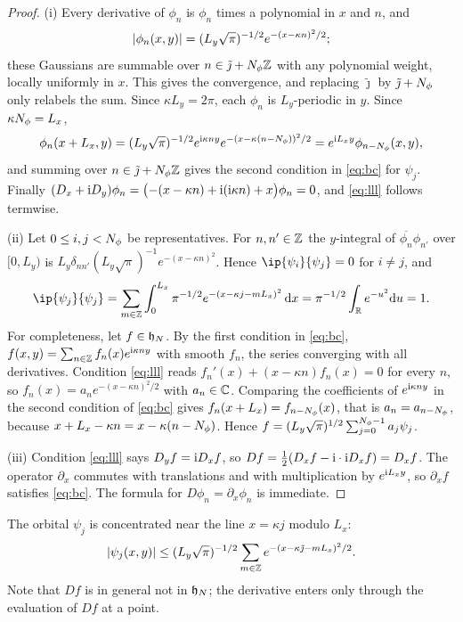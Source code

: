 \begin{proof}
(i) Every derivative of $\phi_n$ is $\phi_n$ times a polynomial in $x$ and $n$, and
\[
\lvert\phi_n(x,y)\rvert=(L_y\sqrt\pi)^{-1/2}e^{-(x-\kappa n)^2/2};
\]
these Gaussians are summable over $n\in\tilde\jmath+N_{\phi}\mathbb{Z}$ with any polynomial weight, locally uniformly in
$x$. This gives the convergence, and replacing $\tilde\jmath$ by $\tilde\jmath+N_{\phi}$ only relabels the sum. Since
$\kappa L_y=2\pi$, each $\phi_n$ is $L_y$-periodic in $y$. Since $\kappa N_{\phi}=L_x$,
\[
\phi_n(x+L_x,y)=(L_y\sqrt\pi)^{-1/2}e^{\mathrm{i}\kappa ny}e^{-(x-\kappa(n-N_{\phi}))^2/2}=e^{\mathrm{i} L_xy}\phi_{n-N_{\phi}}(x,y),
\]
and summing over $n\in\tilde\jmath+N_{\phi}\mathbb{Z}$ gives the second condition in \eqref{eq:bc} for $\psi_j$. Finally
$(D_x+\mathrm{i} D_y)\phi_n=\bigl(-(x-\kappa n)+\mathrm{i}(\mathrm{i}\kappa n)+x\bigr)\phi_n=0$, and \eqref{eq:lll} follows
termwise.

(ii) Let $0\le i,j<N_{\phi}$ be representatives. For $n,n'\in\mathbb{Z}$ the $y$-integral of
$\overline{\phi_n}\phi_{n'}$ over $[0,L_y)$ is $L_y\delta_{nn'}(L_y\sqrt\pi)^{-1}e^{-(x-\kappa n)^2}$. Hence
$\ip{\psi_i}{\psi_j}=0$ for $i\ne j$, and
\[
\ip{\psi_j}{\psi_j}=\sum_{m\in\Z}\int_0^{L_x}\pi^{-1/2}e^{-(x-\kappa j-mL_x)^2}\,\dd x
=\pi^{-1/2}\int_\R e^{-u^2}\dd u=1 .
\]
For completeness, let $f\in\mathfrak{h}_N$. By the first condition in \eqref{eq:bc}, $f(x,y)=\sum_{n\in\mathbb{Z}}f_n(x)e^{\mathrm{i}\kappa ny}$
with smooth $f_n$, the series converging with all derivatives. Condition \eqref{eq:lll} reads
$f_n'(x)+(x-\kappa n)f_n(x)=0$ for every $n$, so $f_n(x)=a_ne^{-(x-\kappa n)^2/2}$ with $a_n\in\mathbb{C}$. Comparing
the coefficients of $e^{\mathrm{i}\kappa ny}$ in the second condition of \eqref{eq:bc} gives
$f_n(x+L_x)=f_{n-N_{\phi}}(x)$, that is $a_n=a_{n-N_{\phi}}$, because $x+L_x-\kappa n=x-\kappa(n-N_{\phi})$. Hence
$f=(L_y\sqrt\pi)^{1/2}\sum_{j=0}^{N_{\phi}-1}a_j\psi_j$.

(iii) Condition \eqref{eq:lll} says $D_yf=\mathrm{i} D_xf$, so $Df=\frac12(D_xf-\mathrm{i}\cdot\mathrm{i} D_xf)=D_xf$. The operator
$\partial_x$ commutes with translations and with multiplication by $e^{\mathrm{i} L_xy}$, so $\partial_xf$ satisfies
\eqref{eq:bc}. The formula for $D\phi_n=\partial_x\phi_n$ is immediate.
\end{proof}

The orbital $\psi_j$ is concentrated near the line $x=\kappa j$ modulo $L_x$:
\[
\lvert\psi_j(x,y)\rvert\le(L_y\sqrt\pi)^{-1/2}\sum_{m\in\mathbb{Z}}e^{-(x-\kappa\tilde\jmath-mL_x)^2/2}.
\]
Note that $Df$ is in general not in $\mathfrak{h}_N$; the derivative enters only through the evaluation of $Df$ at a
point.

